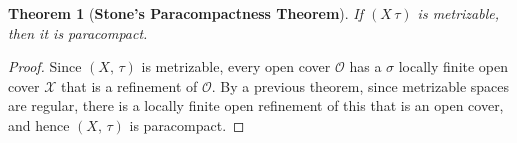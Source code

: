 \documentclass{article}
\theoremstyle{plain}
\newtheorem{theorem}{Theorem}[section]
\theoremstyle{normal}
\begin{document}
        \begin{theorem}[\textbf{Stone's Paracompactness Theorem}]
            If $(X\,\tau)$ is metrizable, then it is paracompact.
        \end{theorem}
        \begin{proof}
            Since $(X,\,\tau)$ is metrizable, every open cover $\mathcal{O}$
            has a $\sigma$ locally finite open cover $\mathcal{X}$ that is a
            refinement of $\mathcal{O}$. By a previous theorem, since
            metrizable spaces are regular, there is a locally finite open
            refinement of this that is an open cover, and hence $(X,\,\tau)$
            is paracompact.
        \end{proof}
\end{document}
